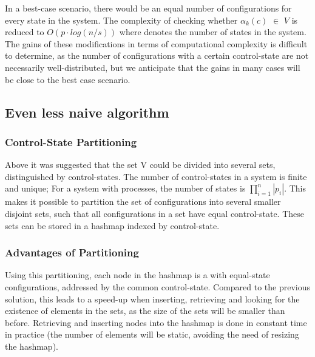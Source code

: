 In a best-case scenario, there would be an equal number of configurations for every state in the system. The complexity of checking whether $\alpha_k(c)$ $\in$ $V$ is reduced to $O(p \cdot log (n/s))$ where  denotes the number of states in the system. The gains of these modifications in terms of computational complexity is difficult to determine, as the number of configurations with a certain control-state are not necessarily well-distributed, but we anticipate that the gains in many cases will be close to the best case scenario.

\subsection{Even less naive algorithm}
\subsubsection{Control-State Partitioning}
Above it was suggested that the set V could be divided into several sets, distinguished by control-states. The number of control-states in a system is finite and unique; For a system with  processes, the number of states is $\prod\limits_{i=1}^n|p_i|$. This makes it possible to partition the set of configurations into several smaller disjoint sets, such that all configurations in a set have equal control-state. These sets can be stored in a hashmap indexed by control-state. 



\subsubsection{Advantages of Partitioning}
Using this partitioning, each node in the hashmap is a  with equal-state configurations, addressed by the common control-state. Compared to the previous solution, this leads to a speed-up when inserting, retrieving and looking for the existence of elements in the sets, as the size of the sets will be smaller than before. Retrieving and inserting nodes into the hashmap is done in constant time in practice (the number of elements will be static, avoiding the need of resizing the hashmap).

